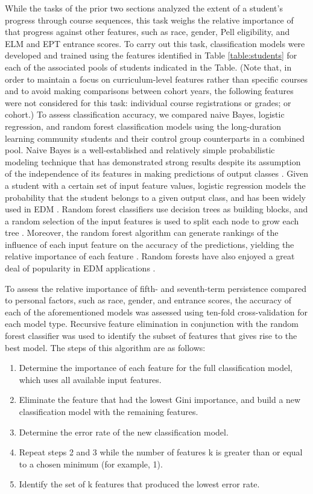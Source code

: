 While the tasks of the prior two sections analyzed the extent of a student's progress through course sequences, this task weighs the relative importance of that progress against other features, such as race, gender, Pell eligibility, and ELM and EPT entrance scores.  To carry out this task, classification models were developed and trained using the features identified in Table \ref{table:students} for each of the associated pools of students indicated in the Table.  (Note that, in order to maintain a focus on curriculum-level features rather than specific courses and to avoid making comparisons between cohort years, the following features were not considered for this task: individual course registrations or grades; or cohort.)  To assess classification accuracy, we compared naive Bayes, logistic regression, and random forest classification models using the long-duration learning community students and their control group counterparts in a combined pool.  Naive Bayes is a well-established and relatively simple probabilistic modeling technique that has demonstrated strong results despite its assumption of the independence of its features in making predictions of output classes \cite{Rish}.  Given a student with a certain set of input feature values, logistic regression models the probability that the student belongs to a given output class, and has been widely used in EDM \cite{Hastie, Romero_2010}.  Random forest classifiers use decision trees as building blocks, and a random selection of the input features is used to split each node to grow each tree \cite{Breiman}.  Moreover, the random forest algorithm can generate rankings of the influence of each input feature on the accuracy of the predictions, yielding the relative importance of each feature \cite{Hastie, Louppe}.  Random forests have also enjoyed a great deal of popularity in EDM applications \cite{Shahiri}.  

To assess the relative importance of fifth- and seventh-term persistence compared to personal factors, such as race, gender, and entrance scores, the accuracy of each of the aforementioned models was assessed using ten-fold cross-validation for each model type.  Recursive feature elimination \cite{Genuer} in conjunction with the random forest classifier was used to identify the subset of features that gives rise to the best model.  The steps of this algorithm are as follows:
\begin{enumerate}
  \item Determine the importance of each feature for the full classification model, which uses all available input features.  
  \item Eliminate the feature that had the lowest Gini importance, and build a new classification model with the remaining features.   
  \item Determine the error rate of the new classification model.
  \item Repeat steps 2 and 3 while the number of features k is greater than or equal to a chosen minimum (for example, 1).
  \item Identify the set of k features that produced the lowest error rate.
\end{enumerate}

